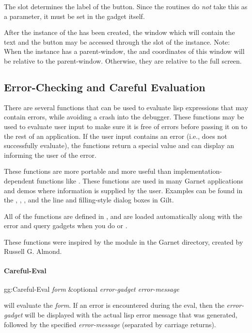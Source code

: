 The  slot determines the label of the button.  Since the
 routines do {\it not} take this as a parameter, it must
be set in the gadget itself.

After the instance of the  has been created, the
window which will contain the text and the button may be accessed
through the  slot of the instance.  Note: When the
 instance has a parent-window, the  and 
coordinates of this window will be relative to the parent-window.
Otherwise, they are relative to the full screen.


\subsection{Error-Checking and Careful Evaluation}
\label{top-careful-eval}

There are several functions that can be used to evaluate lisp expressions
that may contain errors, while avoiding a crash into the debugger.  These
functions may be used to evaluate user input to make sure it is free of
errors before passing it on to the rest of an application.  If the user
input contains an error (i.e., does not successfully evaluate), the
functions return a special value and can display an 
informing the user of the error.

These functions are more portable and more useful than implementation-dependent
functions like .  These functions are used in many Garnet
applications and demos where information is supplied by the user.  Examples
can be found in the , , ,
and the line and filling-style dialog boxes in Gilt.

All of the  functions are defined in ,
and are loaded automatically along with the error and query gadgets when you do
 or
.

These functions were inspired by the  module in the
Garnet  directory, created by Russell G. Almond.


\begin{group}
\paragraph{Careful-Eval}

\begin{programexample}
gg:Careful-Eval {\it form} \&optional {\it error-gadget  error-message} \value{macro}
\end{programexample}

 will evaluate the {\it form}.  If an error is encountered
during the eval, then the {\it error-gadget} will be displayed with the actual
lisp error message that was generated, followed by the specified
{\it error-message} (separated by carriage returns).
\end{group}
\vspace{1 line}

